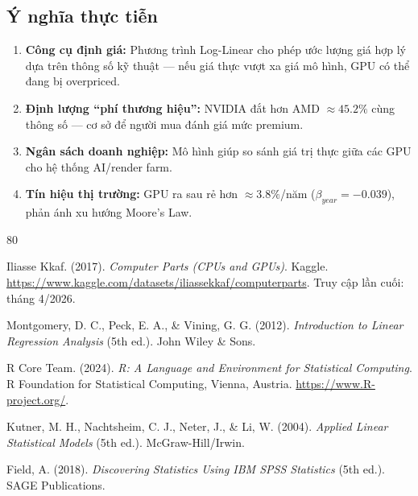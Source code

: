 \documentclass[a4paper]{article}
\begin{document}
\subsection{Ý nghĩa thực tiễn}

\begin{enumerate}
  \item \textbf{Công cụ định giá:} Phương trình Log-Linear cho phép ước lượng giá hợp lý dựa trên thông số kỹ thuật --- nếu giá thực vượt xa giá mô hình, GPU có thể đang bị overpriced.
  \item \textbf{Định lượng ``phí thương hiệu'':} NVIDIA đắt hơn AMD $\approx 45.2\%$ cùng thông số --- cơ sở để người mua đánh giá mức premium.
  \item \textbf{Ngân sách doanh nghiệp:} Mô hình giúp so sánh giá trị thực giữa các GPU cho hệ thống AI/render farm.
  \item \textbf{Tín hiệu thị trường:} GPU ra sau rẻ hơn $\approx 3.8\%$/năm ($\beta_{year} = -0.039$), phản ánh xu hướng Moore's Law.
\end{enumerate}

\begin{thebibliography}{80}
	
	Iliasse Kkaf. (2017).
	\textit{Computer Parts (CPUs and GPUs)}.
	Kaggle.
	\url{https://www.kaggle.com/datasets/iliassekkaf/computerparts}.
	Truy cập lần cuối: tháng 4/2026.
	
	Montgomery, D. C., Peck, E. A., \& Vining, G. G. (2012).
	\textit{Introduction to Linear Regression Analysis} (5th ed.).
	John Wiley \& Sons.
	
	R Core Team. (2024).
	\textit{R: A Language and Environment for Statistical Computing}.
	R Foundation for Statistical Computing, Vienna, Austria.
	\url{https://www.R-project.org/}.
	
	Kutner, M. H., Nachtsheim, C. J., Neter, J., \& Li, W. (2004).
	\textit{Applied Linear Statistical Models} (5th ed.).
	McGraw-Hill/Irwin.
	
	Field, A. (2018).
	\textit{Discovering Statistics Using IBM SPSS Statistics} (5th ed.).
	SAGE Publications.
	
\end{thebibliography}
\end{document}
